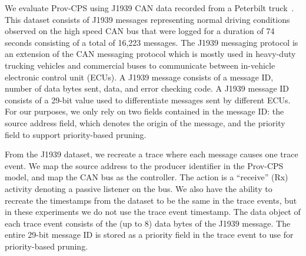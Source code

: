 We evaluate Prov-CPS using J1939 CAN data recorded from a Peterbilt truck~\cite{peterbilt}.  This dataset consists of J1939 messages representing normal driving conditions observed on the high speed CAN bus that were logged for a duration of 74 seconds consisting of a total of 16,223 messages.
%
%
%
%
The J1939 messaging protocol is an extension of the CAN messaging protocol which is mostly used in heavy-duty trucking vehicles and commercial buses to communicate between in-vehicle electronic control unit (ECUs).  %
A J1939 message consists of a message ID, number of data bytes sent, data, and error checking code. 
%
A J1939 message ID consists of a 29-bit value used to differentiate messages sent by different ECUs. %
For our purposes, we only rely on two fields contained in the message ID: the source address field, which denotes the origin of the message, and the priority field to support priority-based pruning.

From the J1939 dataset, we recreate a trace where each message causes one trace event. We map the source address to the producer identifier in the Prov-CPS model, and map the CAN bus as the controller. The action is a ``receive'' (Rx) activity denoting a passive listener on the bus. We also have the ability to recreate the timestamps from the dataset to be the same in the trace events, but in these experiments we do not use the trace event timestamp. The data object of each trace event consists of the (up to 8) data bytes of the J1939 message. The entire 29-bit message ID is stored as a priority field in the trace event to use for priority-based pruning.

